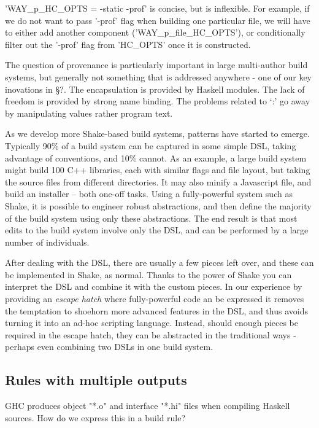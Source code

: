 \lst'WAY_p_HC_OPTS = -static -prof' is concise, but is inflexible. For example,
if we do not want to pass \lst'-prof' flag when building one particular file, we
will have to either add another component (\lst'WAY_p_file_HC_OPTS'), or
conditionally filter out the \lst'-prof' flag from \lst'HC_OPTS' once it is
constructed.


The question of provenance is particularly important in large multi-author build
systems, but generally not something that is addressed anywhere - one of our key
inovations in \S?. The encapsulation is provided by Haskell modules. The lack of
freedom is provided by strong name binding. The problems related to `:' go away
by manipulating values rather program text.


As we develop more Shake-based build systems, patterns have started to emerge.
Typically 90\% of a build system can be captured in some simple DSL, taking
advantage of conventions, and 10\% cannot. As an example, a large build system
might build 100 C++ libraries, each with similar flags and file layout, but
taking the source files from different directories. It may also minify a
Javascript file, and build an installer -- both one-off tasks. Using a
fully-powerful system such as Shake, it is possible to engineer robust
abstractions, and then define the majority of the build system using only these
abstractions. The end result is that most edits to the build system involve only
the DSL, and can be performed by a large number of individuals.

After dealing with the DSL, there are usually a few pieces left over, and these
can be implemented in Shake, as normal. Thanks to the power of Shake you can
interpret the DSL and combine it with the custom pieces. In our experience by
providing an \emph{escape hatch} where fully-powerful code an be expressed it
removes the temptation to shoehorn more advanced features in the DSL, and thus
avoids turning it into an ad-hoc scripting language. Instead, should enough
pieces be required in the escape hatch, they can be abstracted in the
traditional ways - perhaps even combining two DSLs in one build system.

\subsection{Rules with multiple outputs\label{sec:multiple-outputs}}

GHC produces object \lst"*.o" and interface \lst"*.hi" files when compiling
Haskell sources. How do we express this in a build rule?

